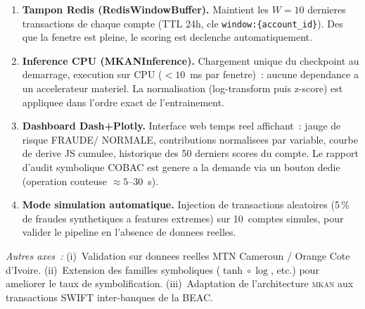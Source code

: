 \documentclass[11pt,a4paper,twocolumn]{article}
\newcommand{\MKAN}{\textsc{mkan}}
\begin{document}
\begin{enumerate}
  \item \textbf{Tampon Redis (RedisWindowBuffer).}
        Maintient les $W=10$ dernieres transactions de chaque compte
        (TTL 24h, cle \texttt{window:\{account\_id\}}). Des que la
        fenetre est pleine, le scoring est declenche automatiquement.

  \item \textbf{Inference CPU (MKANInference).}
        Chargement unique du checkpoint au demarrage, execution sur
        CPU ($<10$~ms par fenetre)~: aucune dependance a un
        accelerateur materiel. La normalisation (log-transform puis
        z-score) est appliquee dans l'ordre exact de l'entrainement.

  \item \textbf{Dashboard Dash+Plotly.}
        Interface web temps reel affichant~: jauge de risque FRAUDE/
        NORMALE, contributions normalisees par variable,
        courbe de derive JS cumulee, historique des 50 derniers scores
        du compte. Le rapport d'audit symbolique COBAC est genere a la
        demande via un bouton dedie (operation couteuse $\approx5$--$30$~s).

  \item \textbf{Mode simulation automatique.}
        Injection de transactions aleatoires (5\,\% de fraudes
        synthetiques a features extremes) sur 10~comptes simules,
        pour valider le pipeline en l'absence de donnees reelles.
\end{enumerate}

\noindent\textit{Autres axes~:}
(i)~Validation sur donnees reelles MTN Cameroun / Orange Cote d'Ivoire.
(ii)~Extension des familles symboliques ($\tanh\circ\log$, etc.)
pour ameliorer le taux de symbolification.
(iii)~Adaptation de l'architecture \MKAN{} aux transactions SWIFT
inter-banques de la BEAC.
\end{document}
